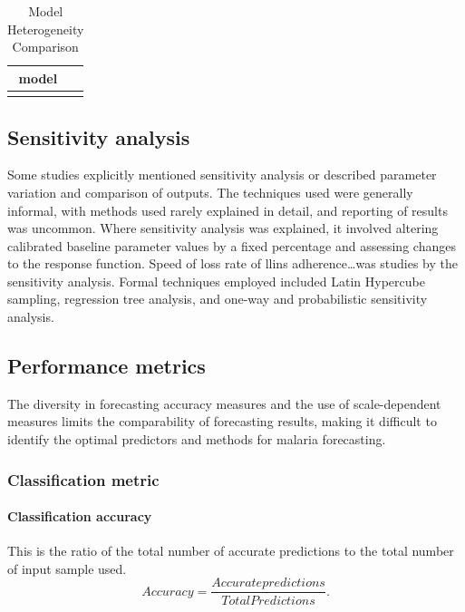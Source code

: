 \documentclass[a4paper, 12pt, twoside]{article}
\begin{document}
\begin{table}[htpb]
  \centering
  \caption{Model Heterogeneity Comparison}
  \label{tab:model_heterogeneity_comparison}
  \begin{tabular}{cc}
  \toprule
  model & \\ 
  \midrule
  \cite{White2018b} & \\
  \bottomrule
  \end{tabular}
\end{table}

\subsection{Sensitivity analysis}%
\label{par:sensitivity_analysis}
Some studies\cite{Mohammed-Awel2019, White2018b} explicitly mentioned sensitivity analysis or described parameter variation and comparison of outputs.
The techniques used were generally informal, with methods used rarely explained in detail, and reporting of results was uncommon.
Where sensitivity analysis was explained, it involved altering calibrated baseline parameter values by a fixed percentage and assessing changes to the response function.
Speed of loss rate of \gls{llins} adherence\cite{White2018b}\ldots was studies by the sensitivity analysis.
Formal techniques employed included Latin Hypercube sampling, regression tree analysis, and one-way and probabilistic sensitivity analysis.

\subsection{Performance metrics}%
\label{par:performance_metrics}
The diversity in forecasting accuracy measures and the use of scale-dependent measures limits the comparability of forecasting results, making it difficult to identify the optimal predictors and methods for malaria forecasting. 
\subsubsection{Classification metric}
\paragraph{Classification accuracy}%
\label{par:classification_accuracy}
This is the ratio of the total number of accurate predictions to the total number of input sample used.
\[
  Accuracy = \frac{Accurate predictions}{Total Predictions}
.\] 
\end{document}
